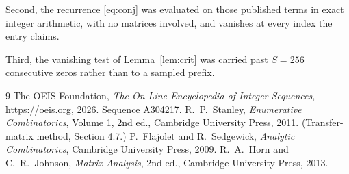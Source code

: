 \documentclass[11pt,a4paper]{article}
\theoremstyle{plain}
\theoremstyle{definition}
\begin{document}
Second, the recurrence \eqref{eq:conj} was evaluated on those published terms in exact
integer arithmetic, with no matrices involved, and vanishes at every index the entry claims.

Third, the vanishing test of Lemma~\ref{lem:crit} was carried past $S=256$ consecutive
zeros rather than to a sampled prefix.

\begin{thebibliography}{9}
 The OEIS Foundation, \emph{The On-Line Encyclopedia of Integer
Sequences}, \url{https://oeis.org}, 2026. Sequence A304217.
 R.~P.~Stanley, \emph{Enumerative Combinatorics}, Volume 1, 2nd ed.,
Cambridge University Press, 2011. (Transfer-matrix method, Section 4.7.)
 P.~Flajolet and R.~Sedgewick, \emph{Analytic Combinatorics}, Cambridge
University Press, 2009.
 R.~A.~Horn and C.~R.~Johnson, \emph{Matrix Analysis}, 2nd ed., Cambridge
University Press, 2013.
\end{thebibliography}
\end{document}
